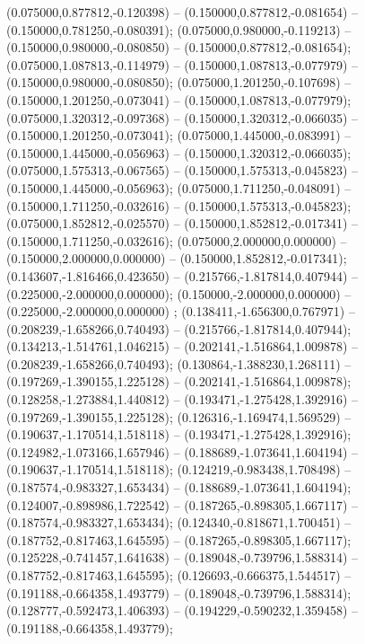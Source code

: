  (0.075000,0.877812,-0.120398) -- (0.150000,0.877812,-0.081654) -- (0.150000,0.781250,-0.080391);
 (0.075000,0.980000,-0.119213) -- (0.150000,0.980000,-0.080850) -- (0.150000,0.877812,-0.081654);
 (0.075000,1.087813,-0.114979) -- (0.150000,1.087813,-0.077979) -- (0.150000,0.980000,-0.080850);
 (0.075000,1.201250,-0.107698) -- (0.150000,1.201250,-0.073041) -- (0.150000,1.087813,-0.077979);
 (0.075000,1.320312,-0.097368) -- (0.150000,1.320312,-0.066035) -- (0.150000,1.201250,-0.073041);
 (0.075000,1.445000,-0.083991) -- (0.150000,1.445000,-0.056963) -- (0.150000,1.320312,-0.066035);
 (0.075000,1.575313,-0.067565) -- (0.150000,1.575313,-0.045823) -- (0.150000,1.445000,-0.056963);
 (0.075000,1.711250,-0.048091) -- (0.150000,1.711250,-0.032616) -- (0.150000,1.575313,-0.045823);
 (0.075000,1.852812,-0.025570) -- (0.150000,1.852812,-0.017341) -- (0.150000,1.711250,-0.032616);
 (0.075000,2.000000,0.000000) -- (0.150000,2.000000,0.000000) -- (0.150000,1.852812,-0.017341);
 (0.143607,-1.816466,0.423650) -- (0.215766,-1.817814,0.407944) -- (0.225000,-2.000000,0.000000);
 (0.150000,-2.000000,0.000000) -- (0.225000,-2.000000,0.000000) ;
 (0.138411,-1.656300,0.767971) -- (0.208239,-1.658266,0.740493) -- (0.215766,-1.817814,0.407944);
 (0.134213,-1.514761,1.046215) -- (0.202141,-1.516864,1.009878) -- (0.208239,-1.658266,0.740493);
 (0.130864,-1.388230,1.268111) -- (0.197269,-1.390155,1.225128) -- (0.202141,-1.516864,1.009878);
 (0.128258,-1.273884,1.440812) -- (0.193471,-1.275428,1.392916) -- (0.197269,-1.390155,1.225128);
 (0.126316,-1.169474,1.569529) -- (0.190637,-1.170514,1.518118) -- (0.193471,-1.275428,1.392916);
 (0.124982,-1.073166,1.657946) -- (0.188689,-1.073641,1.604194) -- (0.190637,-1.170514,1.518118);
 (0.124219,-0.983438,1.708498) -- (0.187574,-0.983327,1.653434) -- (0.188689,-1.073641,1.604194);
 (0.124007,-0.898986,1.722542) -- (0.187265,-0.898305,1.667117) -- (0.187574,-0.983327,1.653434);
 (0.124340,-0.818671,1.700451) -- (0.187752,-0.817463,1.645595) -- (0.187265,-0.898305,1.667117);
 (0.125228,-0.741457,1.641638) -- (0.189048,-0.739796,1.588314) -- (0.187752,-0.817463,1.645595);
 (0.126693,-0.666375,1.544517) -- (0.191188,-0.664358,1.493779) -- (0.189048,-0.739796,1.588314);
 (0.128777,-0.592473,1.406393) -- (0.194229,-0.590232,1.359458) -- (0.191188,-0.664358,1.493779);
